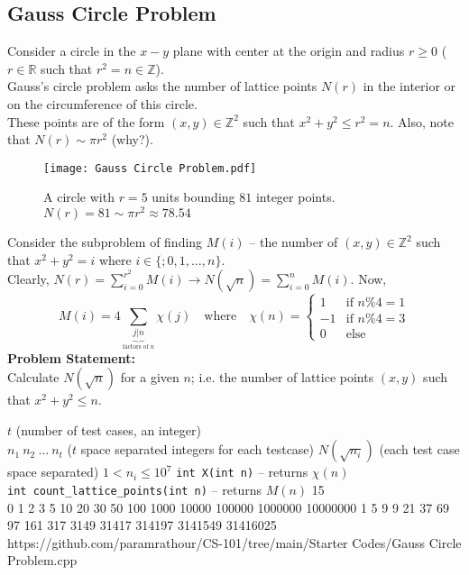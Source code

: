 \documentclass[../../Problems]{subfiles}
\begin{document}
\subsection{Gauss Circle Problem}\label{pp:gausscircle}
Consider a circle in the $x-y$ plane with center at the origin and radius $r\geq 0$ ($r\in\mathbb{R}$ such that $r^2=n\in\mathbb{Z}$).\\
Gauss's circle problem asks the number of lattice points $N(r)$ in the interior or on the circumference of this circle.\\
These points are of the form $(x,y) \in \mathbb{Z}^2$ such that $x^2+y^2\leq r^2=n$. Also, note that $N(r)\sim\pi r^2$ (why?).
\begin{figure}[H]
\centering
\texttt{[image: Gauss Circle Problem.pdf]}
\caption{A circle with $r=5$ units bounding $81$ integer points. $N(r) = 81 \sim\pi r^2\approx78.54$}
\end{figure}
\vspace*{-1em}
Consider the subproblem of finding $M(i)$ -- the number of $(x,y) \in \mathbb{Z}^2$ such that $x^2+y^2=i$ where $i\in\{;0,1,\ldots,n\}.$ %
\\Clearly, $\displaystyle N(r)=\sum_{i=0}^{r^2} M(i) \rightarrow N(\sqrt{n})=\sum_{i=0}^{n} M(i)$. Now,\vspace*{-1em}
\begin{equation}
	M(i) = 4\sum_{\underbrace{j|n}_\text{factors of $n$}}\chi(j)\quad\text{where}\quad\chi(n)=\begin{cases} 
      1 & \text{if $n\%4=1$}\\
      -1 & \text{if $n\%4=3$}\\
      0 & \text{else}
   \end{cases}
\end{equation}
\textbf{Problem Statement:}\\
Calculate $N(\sqrt{n})$ for a given $n$; i.e. the number of lattice points $(x,y)$ such that $x^2+y^2\leq n$.
\begin{testcasesFunction}
	{$t$ \hfill(number of test cases, an integer)\\
	$n_1\ n_2\ \ldots\ n_t$ \hfill($t$ space separated integers for each testcase)}
	{$N(\sqrt{n_i})$ \hfill(each test case space separated)}
	{$1 < n_i \leq 10^{7}$}
	{\texttt{int X(int n)} -- returns $\chi(n)$\\
	\texttt{int count\_lattice\_points(int n)} -- returns $M(n)$}
	{15\\0 1 2 3 5 10 20 30 50 100 1000 10000 100000 1000000 10000000}
	{1 5 9 9 21 37 69 97 161 317 3149 31417 314197 3141549 31416025}
	{https://github.com/paramrathour/CS-101/tree/main/Starter Codes/Gauss Circle Problem.cpp}
\end{testcasesFunction}
\end{document}
